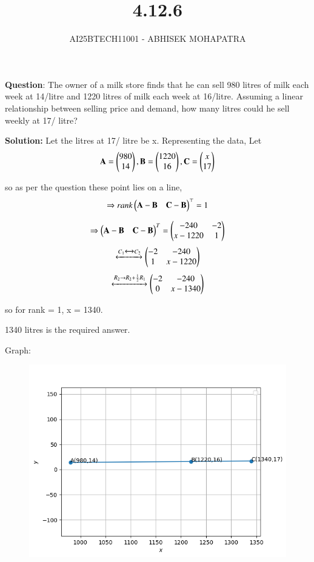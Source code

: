 \documentclass[journal,12pt,onecolumn]{IEEEtran}
\begin{document}
\title{4.12.6}
\author{AI25BTECH11001 - ABHISEK MOHAPATRA}
{\let\newpage\relax\maketitle}
	 	\textbf{Question}:
The owner of a milk store finds that he can sell 980 litres of milk each week
at 14/litre and 1220 litres of milk each week at 16/litre. Assuming a linear
relationship between selling price and demand, how many litres could he sell weekly
at 17/ litre?

		\textbf{Solution:} 
Let the litres at 17/ litre be x.
Representing the data, Let
\begin{align}
\mathbf{A} = \begin{pmatrix}980 \\ 14\end{pmatrix},
\mathbf{B} = \begin{pmatrix}1220 \\ 16\end{pmatrix},
\mathbf{C} = \begin{pmatrix}x \\ 17\end{pmatrix}
\end{align}

so as per the question these point lies on a line,
\begin{align}
	\Rightarrow rank\begin{pmatrix}\mathbf{A}-\mathbf{B} & \mathbf{C}-\mathbf{B}\end{pmatrix}^\top = 1 
\end{align}

\begin{align}
	\Rightarrow \begin{pmatrix}\mathbf{A}-\mathbf{B} & \mathbf{C}-\mathbf{B}\end{pmatrix}^T = \begin{pmatrix}-240 & -2 \\ x-1220 & 1\end{pmatrix} 
\end{align}
\begin{align}
	\xleftrightarrow[]{C_1\xleftrightarrow[]{} C_2} \begin{pmatrix}-2 & -240 \\ 1 & x - 1220\end{pmatrix}
\end{align}
\begin{align}
	\xleftrightarrow[]{R_2\rightarrow R_2 + \frac{1}{2}R_1} \begin{pmatrix}-2 & -240 \\ 0 & x - 1340\end{pmatrix}
\end{align}

so for rank = 1, x = 1340.

1340 litres is the required answer.


Graph:
\begin{figure}[h!]
	\centering
	\includegraphics[width=0.7\linewidth]{fig1.png}
\end{figure}
\end{document}
